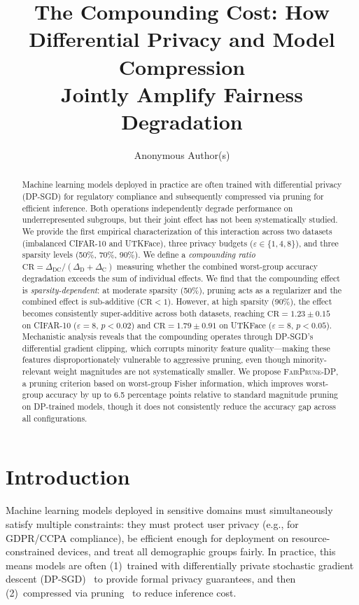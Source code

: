 \documentclass{article}
\title{The Compounding Cost: How Differential Privacy and Model Compression\\ Jointly Amplify Fairness Degradation}
\author{
  Anonymous Author(s)
}
\newcommand{\CR}{\text{CR}}
\newcommand{\FairPrunDP}{\textsc{FairPrune-DP}}
\begin{document}
\maketitle

\begin{abstract}
Machine learning models deployed in practice are often trained with differential privacy (DP-SGD) for regulatory compliance and subsequently compressed via pruning for efficient inference. Both operations independently degrade performance on underrepresented subgroups, but their joint effect has not been systematically studied. We provide the first empirical characterization of this interaction across two datasets (imbalanced CIFAR-10 and UTKFace), three privacy budgets ($\varepsilon \in \{1, 4, 8\}$), and three sparsity levels (50\%, 70\%, 90\%). We define a \emph{compounding ratio} $\CR = \Delta_{\text{DC}} / (\Delta_{\text{D}} + \Delta_{\text{C}})$ measuring whether the combined worst-group accuracy degradation exceeds the sum of individual effects. We find that the compounding effect is \emph{sparsity-dependent}: at moderate sparsity (50\%), pruning acts as a regularizer and the combined effect is sub-additive ($\CR < 1$). However, at high sparsity (90\%), the effect becomes consistently super-additive across both datasets, reaching $\CR = 1.23 \pm 0.15$ on CIFAR-10 ($\varepsilon = 8$, $p < 0.02$) and $\CR = 1.79 \pm 0.91$ on UTKFace ($\varepsilon = 8$, $p < 0.05$). Mechanistic analysis reveals that the compounding operates through DP-SGD's differential gradient clipping, which corrupts minority feature quality---making these features disproportionately vulnerable to aggressive pruning, even though minority-relevant weight magnitudes are not systematically smaller. We propose \FairPrunDP{}, a pruning criterion based on worst-group Fisher information, which improves worst-group accuracy by up to 6.5 percentage points relative to standard magnitude pruning on DP-trained models, though it does not consistently reduce the accuracy gap across all configurations.
\end{abstract}

\section{Introduction}
\label{sec:intro}

Machine learning models deployed in sensitive domains must simultaneously satisfy multiple constraints: they must protect user privacy (e.g., for GDPR/CCPA compliance), be efficient enough for deployment on resource-constrained devices, and treat all demographic groups fairly. In practice, this means models are often (1)~trained with differentially private stochastic gradient descent (DP-SGD)~\citep{abadi2016deep} to provide formal privacy guarantees, and then (2)~compressed via pruning~\citep{han2015learning} to reduce inference cost.
\end{document}
